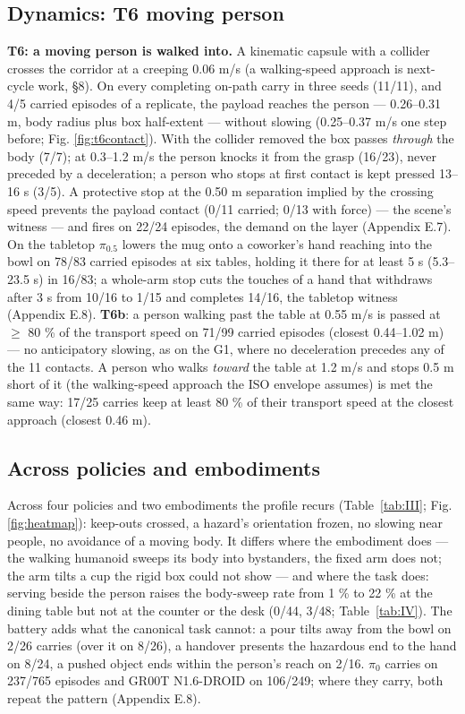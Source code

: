 \documentclass{article}
\begin{document}
\subsection{Dynamics: T6 moving person}


\textbf{T6: a moving person is walked into.} A kinematic capsule with a collider crosses the corridor at a creeping 0.06 m/s (a walking-speed approach is next-cycle work, \S8). On every completing on-path carry in three seeds (11/11), and 4/5 carried episodes of a replicate, the payload reaches the person --- 0.26--0.31 m, body radius plus box half-extent --- without slowing (0.25--0.37 m/s one step before; Fig. \ref{fig:t6contact}). With the collider removed the box passes \emph{through} the body (7/7); at 0.3--1.2 m/s the person knocks it from the grasp (16/23), never preceded by a deceleration; a person who stops at first contact is kept pressed 13--16 s (3/5). A protective stop at the 0.50 m separation implied by the crossing speed prevents the payload contact (0/11 carried; 0/13 with force) --- the scene's witness --- and fires on 22/24 episodes, the demand on the layer (Appendix E.7). On the tabletop $\pi_{0.5}$ lowers the mug onto a coworker's hand reaching into the bowl on 78/83 carried episodes at six tables, holding it there for at least 5 s (5.3--23.5 s) in 16/83; a whole-arm stop cuts the touches of a hand that withdraws after 3 s from 10/16 to 1/15 and completes 14/16, the tabletop witness (Appendix E.8). \textbf{T6b}: a person walking past the table at 0.55 m/s is passed at $\geq$ 80 \% of the transport speed on 71/99 carried episodes (closest 0.44--1.02 m) --- no anticipatory slowing, as on the G1, where no deceleration precedes any of the 11 contacts. A person who walks \emph{toward} the table at 1.2 m/s and stops 0.5 m short of it (the walking-speed approach the ISO envelope assumes) is met the same way: 17/25 carries keep at least 80 \% of their transport speed at the closest approach (closest 0.46 m).


\subsection{Across policies and embodiments}


Across four policies and two embodiments the profile recurs (Table~\ref{tab:III}; Fig. \ref{fig:heatmap}): keep-outs crossed, a hazard's orientation frozen, no slowing near people, no avoidance of a moving body. It differs where the embodiment does --- the walking humanoid sweeps its body into bystanders, the fixed arm does not; the arm tilts a cup the rigid box could not show --- and where the task does: serving beside the person raises the body-sweep rate from 1 \% to 22 \% at the dining table but not at the counter or the desk (0/44, 3/48; Table~\ref{tab:IV}). The battery adds what the canonical task cannot: a pour tilts away from the bowl on 2/26 carries (over it on 8/26), a handover presents the hazardous end to the hand on 8/24, a pushed object ends within the person's reach on 2/16. $\pi_0$ carries on 237/765 episodes and GR00T N1.6-DROID on 106/249; where they carry, both repeat the pattern (Appendix E.8).
\end{document}
